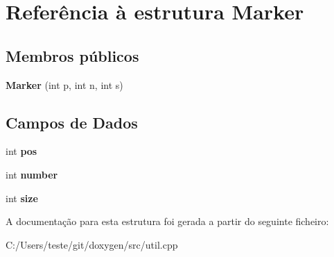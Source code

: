 \hypertarget{struct_marker}{\section{Referência à estrutura Marker}
\label{struct_marker}
}
\subsection*{Membros públicos}
\begin{DoxyCompactItemize}
\item 
\hypertarget{struct_marker_a3d0248ca77b10d330f9d238eae30988a}{{\bfseries Marker} (int p, int n, int s)}\label{struct_marker_a3d0248ca77b10d330f9d238eae30988a}

\end{DoxyCompactItemize}
\subsection*{Campos de Dados}
\begin{DoxyCompactItemize}
\item 
\hypertarget{struct_marker_a1910d262855b71da353ed0d07a6c7823}{int {\bfseries pos}}\label{struct_marker_a1910d262855b71da353ed0d07a6c7823}

\item 
\hypertarget{struct_marker_a7106e2abc437ad981830d14176d15f09}{int {\bfseries number}}\label{struct_marker_a7106e2abc437ad981830d14176d15f09}

\item 
\hypertarget{struct_marker_a439227feff9d7f55384e8780cfc2eb82}{int {\bfseries size}}\label{struct_marker_a439227feff9d7f55384e8780cfc2eb82}

\end{DoxyCompactItemize}


A documentação para esta estrutura foi gerada a partir do seguinte ficheiro\-:\begin{DoxyCompactItemize}
\item 
C\-:/\-Users/teste/git/doxygen/src/util.\-cpp\end{DoxyCompactItemize}
